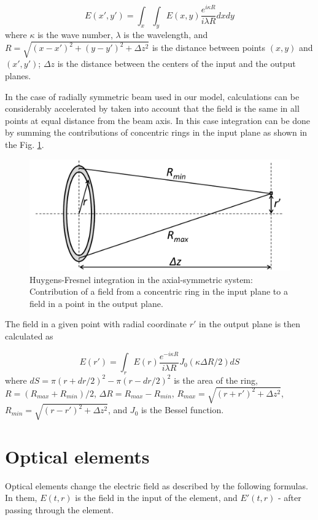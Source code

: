 \documentclass{report}
\begin{document}
\begin{equation}
E(x', y') = \int_x\int_y E(x,y) \frac{e^{i\kappa R}}{i\lambda R} dx dy
\end{equation}
where $\kappa$ is the wave number, $\lambda$ is the wavelength, and $R=\sqrt{(x-x')^2+(y-y')^2+\Delta z^2}$ is the distance between points $(x,y)$ and $(x',y')$; $\Delta z$ is the distance between the centers of the input and the output planes.

In the case of radially symmetric beam used in our model, calculations can be considerably accelerated by taken into account that the field is the same in all points at equal distance from the beam axis. In this case integration can be done by summing the contributions of concentric rings in the input plane as shown in the Fig. \ref{fig:Huygens-Fresnel}.

\begin{figure}[ht]
\centering
\includegraphics[width=120mm]{images/huygens-fresnel}
\caption{Huygens-Fresnel integration in the axial-symmetric system: Contribution of a field from a concentric ring in the input plane to a field in a point in the output plane.}\label{fig:Huygens-Fresnel}
\end{figure}

The field in a given point with radial coordinate $r'$ in the output plane is then calculated as

\begin{equation}
E(r') = \int_{r}E(r)\frac{e^{-i\kappa R}}{i\lambda R} J_0(\kappa \Delta R/2) dS
\end{equation}
where $dS = \pi(r+dr/2)^2-\pi(r-dr/2)^2$ is the area of the ring, $R=(R_{max}+R_{min})/2$, $\Delta R=R_{max}-R_{min}$, $R_{max}=\sqrt{(r+r')^2+\Delta z^2}$, $R_{min}=\sqrt{(r-r')^2+\Delta z^2}$, and $J_0$ is the Bessel function.

\section{Optical elements}
Optical elements change the electric field as described by the following formulas. In them, $E(t,r)$ is the field in the input of the element, and $E'(t,r)$ - after passing through the element.
\end{document}
